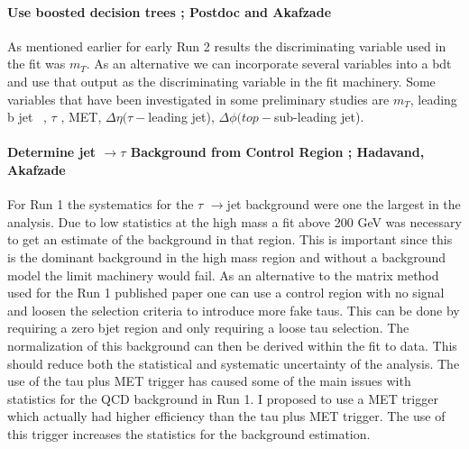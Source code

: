\documentclass[11pt]{article}
\newcommand{\too}{$\rightarrow$}
\begin{document}
\paragraph{Use boosted decision trees ;  Postdoc and Akafzade}
As mentioned earlier for early Run 2 results the discriminating variable used in the fit was $m_T$. As an alternative we can incorporate several 
variables into a bdt and use that output as the discriminating variable in the fit machinery.  Some variables that have been investigated in some preliminary studies
are $m_T$, leading b jet \pt\ , $\tau$ \pt, MET, $\Delta \eta(\tau-$leading jet), $\Delta \phi(top-$sub-leading jet).

\paragraph{Determine jet \too $\tau$ Background from Control Region ;  Hadavand, Akafzade}  %
For Run 1 the systematics for the $\tau$ \too jet background were one the largest in the analysis.  Due to low statistics at the high mass a fit above 200 GeV was necessary to get 
an estimate of the background in that region.  This is important since this is the dominant background in the high mass region and without a background model the limit machinery would fail.
As an alternative to the matrix method used for the Run 1 published paper one can use a control region with no signal and loosen the selection criteria to introduce more fake taus.  This can be done
by requiring a zero bjet region and only requiring a loose tau selection.  The normalization of this background can then be derived within the fit to data.  This should reduce both the statistical and systematic uncertainty of the analysis.
The use of the tau plus MET trigger has caused some of the main issues with statistics for the QCD background in Run 1. I proposed to use a MET trigger which actually had higher efficiency than the tau plus MET trigger.  
The use of this trigger increases the statistics for the background estimation.


\end{document}
